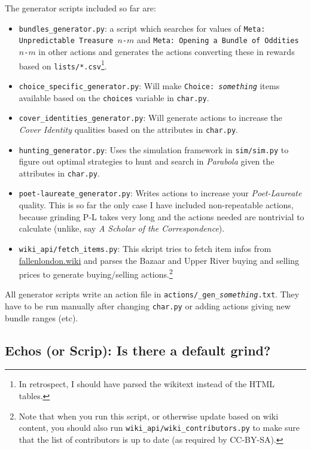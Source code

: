 \documentclass[a4paper,11pt,openright,twoside]{scrartcl}
\begin{document}
The generator scripts included so far are:
\begin{itemize}
\item \texttt{bundles\_generator.py}: a script which searches for values of \texttt{Meta: Unpredictable Treasure $n$-$m$} and \texttt{Meta: Opening a Bundle of Oddities $n$-$m$} in other actions and generates the actions converting these in rewards based on \texttt{lists/*.csv}\footnote{In retrospect, I should have parsed the wikitext instead of the HTML tables.}. 
\item \texttt{choice\_specific\_generator.py}: Will make \texttt{Choice: \emph{something}} items available based on the \texttt{choices} variable in \texttt{char.py}.
\item \texttt{cover\_identities\_generator.py}: Will generate actions to increase the \emph{Cover Identity} qualities based on the attributes in \texttt{char.py}.
\item \texttt{hunting\_generator.py}: Uses the simulation framework in \texttt{sim/sim.py} to figure out optimal strategies to hunt and search in \emph{Parabola} given the attributes in \texttt{char.py}.

\item \texttt{poet-laureate\_generator.py}: Writes actions to increase your \emph{Poet-Laureate} quality. This is so far the only case I have included non-repeatable actions, because grinding P-L takes very long and the actions needed are nontrivial to calculate (unlike, say \emph{A Scholar of the Correspondence}). 
\item \texttt{wiki\_api/fetch\_items.py}: This skript tries to fetch item infos from \url{fallenlondon.wiki} and parses the Bazaar and Upper River buying and selling prices to generate buying/selling actions.\footnote{Note that when you run this script, or otherwise update based on wiki content, you should also run \texttt{wiki\_api/wiki\_contributors.py} to make sure that the list of contributors is up to date (as required by CC-BY-SA).}
\end{itemize}
All generator scripts write an action file in \texttt{actions/\_gen\_\emph{something}.txt}. They have to be run manually after changing \texttt{char.py} or adding actions giving new bundle ranges (etc).  


\subsection{ Echos (or Scrip): Is there a default grind?}
\end{document}
